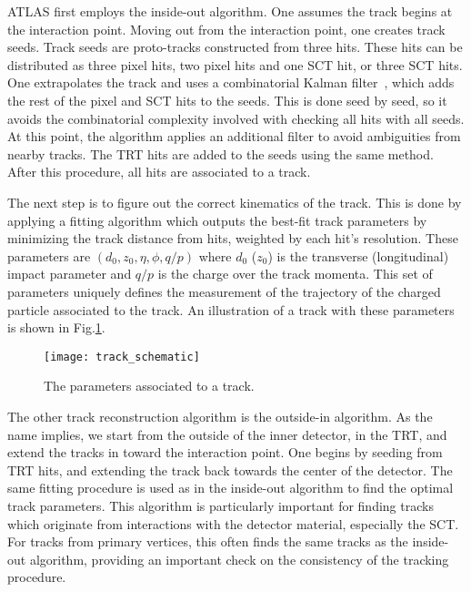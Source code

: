 ATLAS first employs the inside-out algorithm.
One assumes the track begins at the interaction point.
Moving out from the interaction point, one creates track seeds.
Track seeds are proto-tracks constructed from three hits.
These hits can be distributed as three pixel hits, two pixel hits and one SCT hit, or three SCT hits.
One extrapolates the track and uses a combinatorial Kalman filter~\cite{ATLAS-CONF-2012-042}, which adds the rest of the pixel and SCT hits to the seeds.
This is done seed by seed, so it avoids the combinatorial complexity involved with checking all hits with all seeds.
At this point, the algorithm applies an additional filter to avoid ambiguities from nearby tracks.
The TRT hits are added to the seeds using the same method.
After this procedure, all hits are associated to a track.

The next step is to figure out the correct kinematics of the track.
This is done by applying a fitting algorithm which outputs the best-fit track parameters by minimizing the track distance from hits, weighted by each hit's resolution.
These parameters are $(d_0, z_0, \eta, \phi, q/p)$ where $d_0$ ($z_0$) is the transverse (longitudinal) impact parameter and $q/p$ is the charge over the track momenta.
This set of parameters uniquely defines the measurement of the trajectory of the charged particle associated to the track.
An illustration of a track with these parameters is shown in Fig.\ref{fig:track_schematic}.

\begin{figure}
\caption{The parameters associated to a track.}
\label{fig:track_schematic}
\texttt{[image: track\_schematic]}
\end{figure}

The other track reconstruction algorithm is the outside-in algorithm.
As the name implies, we start from the outside of the inner detector, in the TRT, and extend the tracks in toward the interaction point.
One begins by seeding from TRT hits, and extending the track back towards the center of the detector.
The same fitting procedure is used as in the inside-out algorithm to find the optimal track parameters.
This algorithm is particularly important for finding tracks which originate from interactions with the detector material, especially the SCT.
For tracks from primary vertices, this often finds the same tracks as the inside-out algorithm, providing an important check on the consistency of the tracking procedure.

